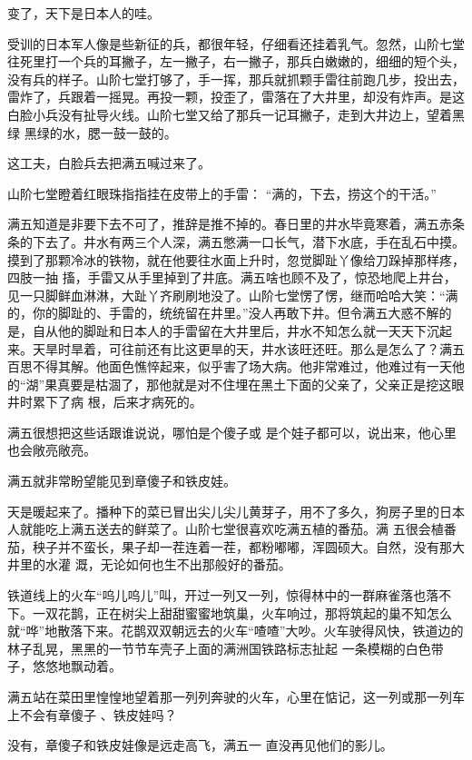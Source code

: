 \documentclass{article}
\begin{document}
\newpage
变了，天下是日本人的哇。 

受训的日本军人像是些新征的兵，都很年轻，仔细看还挂着乳气。忽然，山阶七堂往死里打一个兵的耳撇子，左一撇子，右一撇子，那兵白嫩嫩的，细细的短个头，没有兵的样子。山阶七堂打够了，手一挥，那兵就抓颗手雷往前跑几步，投出去，雷炸了，兵跟着一摇晃。再投一颗，投歪了，雷落在了大井里，却没有炸声。是这白脸小兵没有扯导火线。山阶七堂又给了那兵一记耳撇子，走到大井边上，望着黑绿
黑绿的水，腮一鼓一鼓的。 


这工夫，白脸兵去把满五喊过来了。 

山阶七堂瞪着红眼珠指指挂在皮带上的手雷：
“满的，下去，捞这个的干活。” 

满五知道是非要下去不可了，推辞是推不掉的。春日里的井水毕竟寒着，满五赤条条的下去了。井水有两三个人深，满五憋满一口长气，潜下水底，手在乱石中摸。摸到了那颗冷冰的铁物，就在他要往水面上升时，忽觉脚趾丫像给刀跺掉那样疼，四肢一抽
\newpage
搐，手雷又从手里掉到了井底。满五啥也顾不及了，惊恐地爬上井台，见一只脚鲜血淋淋，大趾丫齐刷刷地没了。山阶七堂愣了愣，继而哈哈大笑：“满的，你的脚趾的、手雷的，统统留在井里。”没人再敢下井。但令满五大惑不解的是，自从他的脚趾和日本人的手雷留在大井里后，井水不知怎么就一天天下沉起来。天旱时旱着，可往前还有比这更旱的天，井水该旺还旺。那么是怎么了？满五百思不得其解。他面色憔悴起来，似乎害了场大病。他非常难过，他难过有一天他的“湖”果真要是枯涸了，那他就是对不住埋在黑土下面的父亲了，父亲正是挖这眼井时累下了病
根，后来才病死的。 

满五很想把这些话跟谁说说，哪怕是个傻子或
是个娃子都可以，说出来，他心里也会敞亮敞亮。 


满五就非常盼望能见到章傻子和铁皮娃。 

天是暖起来了。播种下的菜已冒出尖儿尖儿黄芽子，用不了多久，狗房子里的日本人就能吃上满五送去的鲜菜了。山阶七堂很喜欢吃满五植的番茄。满
\newpage
五很会植番茄，秧子并不蛮长，果子却一茬连着一茬，都粉嘟嘟，浑圆硕大。自然，没有那大井里的水灌
溉，无论如何也生不出那般好的番茄。 

铁道线上的火车“呜儿呜儿”叫，开过一列又一列，惊得林中的一群麻雀落也落不下。一双花鹊，正在树尖上甜甜蜜蜜地筑巢，火车响过，那将筑起的巢不知怎么就“哗”地散落下来。花鹊双双朝远去的火车“喳喳”大吵。火车驶得风快，铁道边的林子乱晃，黑黑的一节节车壳子上面的满洲国铁路标志扯起
一条模糊的白色带子，悠悠地飘动着。 

满五站在菜田里惶惶地望着那一列列奔驶的火车，心里在惦记，这一列或那一列车上不会有章傻子
、铁皮娃吗？ 

没有，章傻子和铁皮娃像是远走高飞，满五一
直没再见他们的影儿。 
\end{document}

